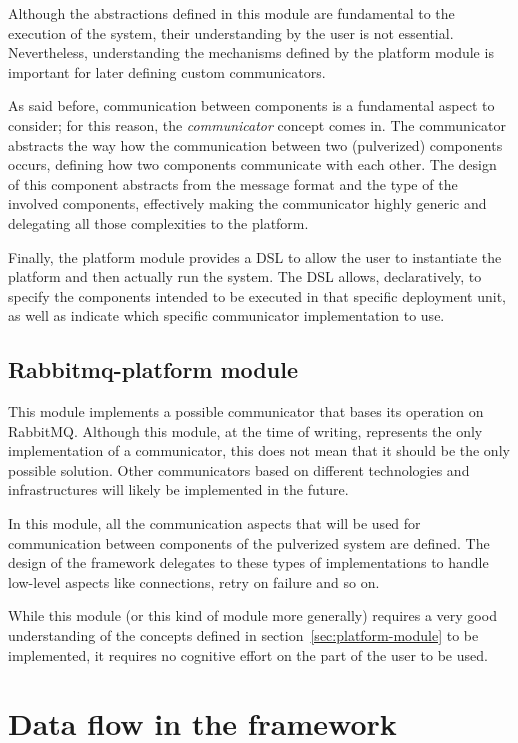 Although the abstractions defined in this module are fundamental to the execution of the system, their understanding by the user is not essential.
Nevertheless, understanding the mechanisms defined by the platform module is important for later defining custom communicators.

As said before, communication between components is a fundamental aspect to consider; for this reason, the \emph{communicator} concept comes in.
The communicator abstracts the way how the communication between two (pulverized) components occurs, defining how two components communicate with
each other. The design of this component abstracts from the message format and the type of the involved components, effectively making the
communicator highly generic and delegating all those complexities to the platform.

Finally, the platform module provides a DSL to allow the user to instantiate the platform and then actually run the system.
The DSL allows, declaratively, to specify the components intended to be executed in that specific deployment unit, as well as indicate which
specific communicator implementation to use.


\subsection{Rabbitmq-platform module}
\label{sec:rabbitmq-platform-module}

This module implements a possible communicator that bases its operation on RabbitMQ. Although this module, at the time of writing, represents
the only implementation of a communicator, this does not mean that it should be the only possible solution.
Other communicators based on different technologies and infrastructures will likely be implemented in the future.

In this module, all the communication aspects that will be used for communication between components of the pulverized system are defined.
The design of the framework delegates to these types of implementations to handle low-level aspects like connections, retry on failure and so on.

While this module (or this kind of module more generally) requires a very good understanding of the concepts defined in 
section~\ref{sec:platform-module} to be implemented, it requires no cognitive effort on the part of the user to be used.

\section{Data flow in the framework}
\label{sec:framework-data-flow}

